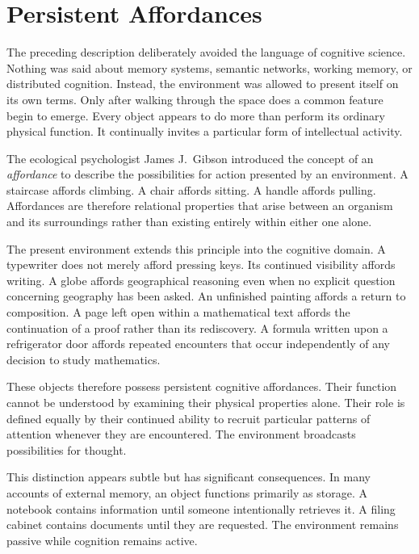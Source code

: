 \documentclass[12pt,oneside]{article}
\theoremstyle{remark}
\begin{document}

\section{Persistent Affordances}

The preceding description deliberately avoided the language of cognitive science. Nothing was said about memory systems, semantic networks, working memory, or distributed cognition. Instead, the environment was allowed to present itself on its own terms. Only after walking through the space does a common feature begin to emerge. Every object appears to do more than perform its ordinary physical function. It continually invites a particular form of intellectual activity.

The ecological psychologist James J.~Gibson introduced the concept of an \emph{affordance} to describe the possibilities for action presented by an environment. A staircase affords climbing. A chair affords sitting. A handle affords pulling. Affordances are therefore relational properties that arise between an organism and its surroundings rather than existing entirely within either one alone.

The present environment extends this principle into the cognitive domain. A typewriter does not merely afford pressing keys. Its continued visibility affords writing. A globe affords geographical reasoning even when no explicit question concerning geography has been asked. An unfinished painting affords a return to composition. A page left open within a mathematical text affords the continuation of a proof rather than its rediscovery. A formula written upon a refrigerator door affords repeated encounters that occur independently of any decision to study mathematics.

These objects therefore possess persistent cognitive affordances. Their function cannot be understood by examining their physical properties alone. Their role is defined equally by their continued ability to recruit particular patterns of attention whenever they are encountered. The environment broadcasts possibilities for thought.

This distinction appears subtle but has significant consequences. In many accounts of external memory, an object functions primarily as storage. A notebook contains information until someone intentionally retrieves it. A filing cabinet contains documents until they are requested. The environment remains passive while cognition remains active.
\end{document}
